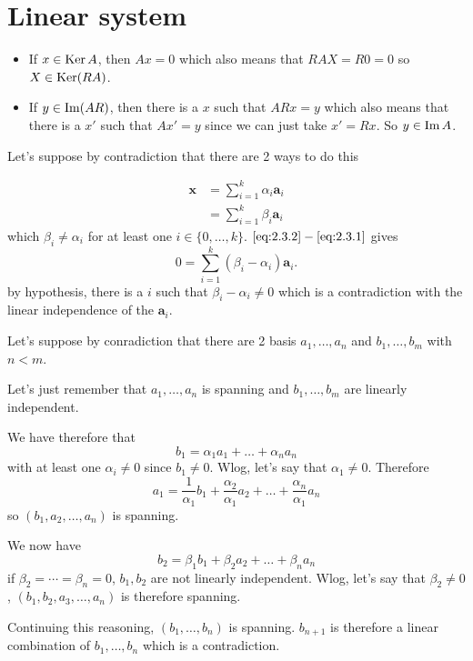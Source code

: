 \section{Linear system}
\nosolution

\begin{solution}
  \begin{itemize}
    \item If $x \in \operatorname{Ker} A$, then $Ax = 0$
      which also means that $RAX = R0 = 0$ so $X \in \operatorname{Ker}(RA)$.
    \item If $y \in \operatorname{Im}(AR)$, then there is a $x$
      such that $ARx = y$
      which also means that there is a $x'$ such that
      $Ax' = y$ since we can just take $x' = Rx$.
      So $y \in \operatorname{Im} A$.
  \end{itemize}
\end{solution}

\begin{solution}
  Let's suppose by contradiction that there are 2 ways
  to do this

  \begin{align}
    \label{eq:2.3.1}
    \mathbf{x} & = \sum_{i=1}^k \alpha_i \mathbf{a}_i\\
    \label{eq:2.3.2}
               & = \sum_{i=1}^k \beta_i \mathbf{a}_i
  \end{align}
  which $\beta_i \neq \alpha_i$ for at least one $i \in \{0, \ldots, k\}$.
  $\eqref{eq:2.3.2}-\eqref{eq:2.3.1}$ gives
  \[
    0 = \sum_{i=1}^k (\beta_i-\alpha_i) \mathbf{a}_i.
  \]
  by hypothesis, there is a $i$ such that $\beta_i-\alpha_i \neq 0$
  which is a contradiction with the linear independence of the $\mathbf{a}_i$.
\end{solution}

\begin{solution}
  Let's suppose by conradiction that there are 2
  basis $a_1, \ldots, a_n$ and $b_1, \ldots, b_m$ with $n < m$.

  Let's just remember that $a_1, \ldots, a_n$ is spanning
  and $b_1, \ldots, b_m$ are linearly independent.

  We have therefore that
  \[ b_1 = \alpha_1 a_1 + \ldots + \alpha_n a_n\]
  with at least one $\alpha_i \neq 0$ since $b_1 \neq 0$.
  Wlog, let's say that $\alpha_1 \neq 0$.
  Therefore
  \[ a_1 = \frac{1}{\alpha_1}b_1 + \frac{\alpha_2}{\alpha_1} a_2 + \ldots + \frac{\alpha_n}{\alpha_1} a_n\]
  so $(b_1, a_2, \ldots, a_n)$ is spanning.

  We now have
  \[ b_2 = \beta_1 b_1 + \beta_2 a_2 + \ldots + \beta_n a_n\]
  if $\beta_2 = \cdots = \beta_n = 0$, $b_1, b_2$ are not linearly independent.
  Wlog, let's say that $\beta_2 \neq 0$,
  $(b_1,b_2,a_3,\ldots,a_n)$ is therefore spanning.

  Continuing this reasoning, $(b_1,\ldots,b_n)$ is spanning.
  $b_{n+1}$ is therefore a linear combination of $b_1, \ldots, b_n$ which is a contradiction.
\end{solution}

